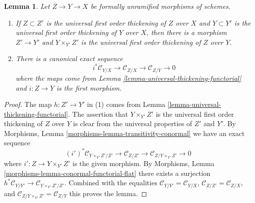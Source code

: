 \documentclass[10pt,a4paper]{amsart}
\theoremstyle{plain}
\newtheorem{lemma}[subsection]{Lemma}
\theoremstyle{definition}
\theoremstyle{remark}
\numberwithin{equation}{subsection}
\begin{document}
\begin{lemma}
\label{lemma-transitivity-conormal}
Let $Z \to Y \to X$ be formally unramified morphisms of schemes.
\begin{enumerate}
\item If $Z \subset Z'$ is the universal first order thickening of $Z$
over $X$ and $Y \subset Y'$ is the universal first order thickening of $Y$
over $X$, then there is a morphism $Z' \to Y'$ and $Y \times_{Y'} Z'$ is
the universal first order thickening of $Z$ over $Y$.
\item There is a canonical exact sequence
$$
i^*\mathcal{C}_{Y/X} \to
\mathcal{C}_{Z/X} \to
\mathcal{C}_{Z/Y} \to 0
$$
where the maps come from
Lemma \ref{lemma-universal-thickening-functorial}
and $i : Z \to Y$ is the first morphism.
\end{enumerate}
\end{lemma}

\begin{proof}
The map $h : Z' \to Y'$ in (1) comes from
Lemma \ref{lemma-universal-thickening-functorial}.
The assertion that $Y \times_{Y'} Z'$ is the universal first order
thickening of $Z$ over $Y$ is clear from the universal properties
of $Z'$ and $Y'$. By
Morphisms, Lemma \ref{morphisms-lemma-transitivity-conormal}
we have an exact sequence
$$
(i')^*\mathcal{C}_{Y \times_{Y'} Z'/Z'} \to
\mathcal{C}_{Z/Z'} \to
\mathcal{C}_{Z/Y \times_{Y'} Z'} \to 0
$$
where $i' : Z \to Y \times_{Y'} Z'$ is the given morphism. By
Morphisms, Lemma \ref{morphisms-lemma-conormal-functorial-flat}
there exists a surjection
$h^*\mathcal{C}_{Y/Y'} \to \mathcal{C}_{Y \times_{Y'} Z'/Z'}$.
Combined with the equalities
$\mathcal{C}_{Y/Y'} = \mathcal{C}_{Y/X}$,
$\mathcal{C}_{Z/Z'} = \mathcal{C}_{Z/X}$, and
$\mathcal{C}_{Z/Y \times_{Y'} Z'} = \mathcal{C}_{Z/Y}$
this proves the lemma.
\end{proof}
\end{document}
